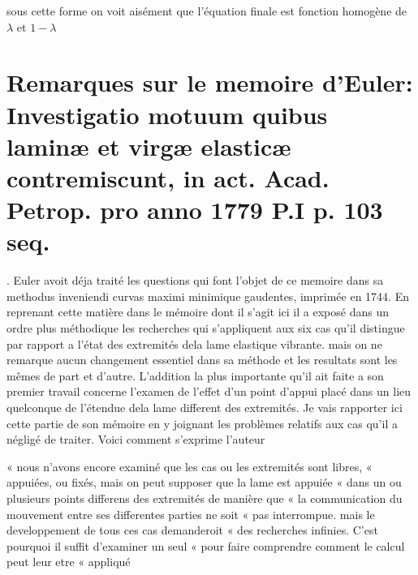 \documentclass[11pt,a4paper]{article}
\begin{document}
sous cette forme on voit aisément que l'équation finale est fonction homogène
de $\lambda$ et $1-\lambda$


\section{Remarques sur le memoire d'Euler: Investigatio motuum quibus laminæ et virgæ elasticæ contremiscunt, in act. Acad. Petrop. pro anno 1779 P.I p. 103 seq.}

\struck{\ill{}}. Euler avoit déja traité les questions qui font l'objet de ce memoire
dans sa methodus inveniendi curvas maximi minimique gaudentes,
imprimée en 1744. En reprenant cette matière dans le mémoire dont
il s'agit ici il a exposé dans un ordre plus méthodique les recherches
qui s'appliquent aux six cas qu'il distingue par rapport a l'état
des extremités dela lame elastique vibrante. mais on ne remarque
aucun changement essentiel dans sa méthode et les resultats sont
les mêmes de part et d'autre. L'addition la plus importante
qu'il ait faite a son premier travail concerne l'examen de l'effet
d'un point d'appui placé dans un lieu quelconque de l'étendue
dela lame different des extremités. Je vais rapporter ici cette
partie de son mémoire en y joignant les problèmes relatifs aux
cas qu'il a négligé de traiter.
Voici comment s'exprime l'auteur 

« nous n'avons encore examiné que les cas ou les extremités sont libres,
« appuiées, ou fixés, mais on peut supposer que la lame est appuiée « dans
un ou plusieurs points differens des extremités de manière que « la
communication du mouvement entre ses differentes parties ne soit « pas
interrompue. mais le developpement de tous ces cas demanderoit « des
recherches infinies. C'est pourquoi il suffit d'examiner un seul « pour faire
comprendre comment le calcul peut leur etre « appliqué
\end{document}
